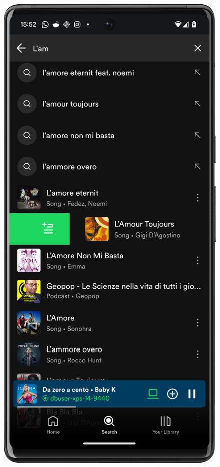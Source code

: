 \documentclass{article}
\begin{document}
\begin{figure}[H]
\begin{minipage}{0.24\textwidth}
        \label{fig:portfolio_screen}
    \end{minipage}
    \hfill
    \begin{minipage}{0.24\textwidth}
        \centering
        \includegraphics[width=\textwidth]{foto/swipe_interaction_spotify}

\end{minipage}
\end{figure}
\end{document}
